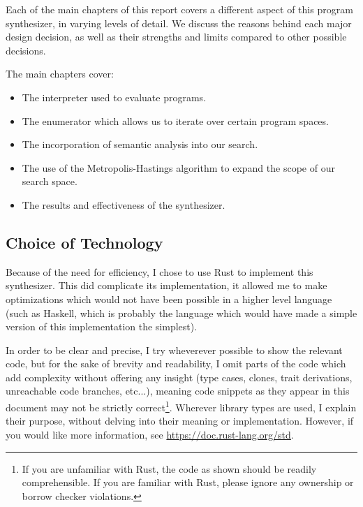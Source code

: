 Each of the main chapters of this report covers a different aspect of this program synthesizer, in varying levels of detail. We discuss the reasons behind each major design decision, as well as their strengths and limits compared to other possible decisions.

The main chapters cover:
\begin{itemize}
  \item The interpreter used to evaluate programs.
  \item The enumerator which allows us to iterate over certain program spaces.   
  \item The incorporation of semantic analysis into our search.
  \item The use of the Metropolis-Hastings algorithm to expand the scope of our search space. 
  \item The results and effectiveness of the synthesizer.
\end{itemize}

\subsection{Choice of Technology}

Because of the need for efficiency, I chose to use Rust to implement this synthesizer. This did complicate its implementation, it allowed me to make optimizations which would not have been possible in a higher level language (such as Haskell, which is probably the language which would have made a simple version of this implementation the simplest).

In order to be clear and precise, I try wheverever possible to show the relevant code, but for the sake of brevity and readability, I omit parts of the code which add complexity without offering any insight (type cases, clones, trait derivations, unreachable code branches, etc...), meaning code snippets as they appear in this document may not be strictly correct\footnote{If you are unfamiliar with Rust, the code as shown should be readily comprehensible. If you are familiar with Rust, please ignore any ownership or borrow checker violations.}. Wherever library types are used, I explain their purpose, without delving into their meaning or implementation. However, if you would like more information, see \url{https://doc.rust-lang.org/std}.
